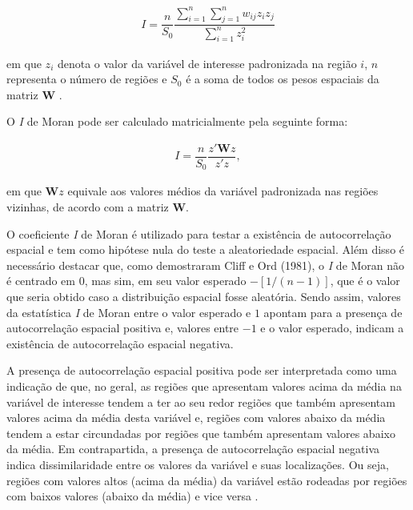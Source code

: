 \documentclass[12pt,a4paper]{article}
\begin{document}
\begin{align}\label{IMoran_g}
    I = \dfrac{n}{S_0} \dfrac{\displaystyle\sum_{i=1}^{n} \displaystyle\sum_{j=1}^{n} w_{ij} z_i z_j}{\displaystyle\sum_{i=1}^{n} z_i^2}
\end{align}
	
\noindent em que $z_i$ denota o valor da variável de interesse padronizada na região $i$, $n$ representa o número de regiões e $S_0$ é a soma de todos os pesos espaciais da matriz $\boldsymbol{W}$ \cite{almeida12_g}.
	
O \textit{I} de Moran pode ser calculado matricialmente pela seguinte forma:
	
\begin{align*}
	I = \dfrac{n}{S_0} \dfrac{z'\boldsymbol{W}z}{z'z},
\end{align*}
	
\noindent em que $\boldsymbol{W}z$ equivale aos valores médios da variável padronizada nas regiões vizinhas, de acordo com a matriz $\boldsymbol{W}$.

O coeficiente \textit{I} de Moran é utilizado para testar a existência de autocorrelação espacial e tem como hipótese nula do teste a aleatoriedade espacial. Além disso é necessário destacar que, como demostraram Cliff e Ord (1981), o \textit{I} de Moran não é centrado em $0$, mas sim, em seu valor esperado $-[1/(n-1)]$, que é o valor que seria obtido caso a distribuição espacial fosse aleatória. Sendo assim, valores da estatística \textit{I} de Moran entre o valor esperado e $1$ apontam para a presença de autocorrelação espacial positiva e, valores entre $-1$ e o valor esperado, indicam a existência de autocorrelação espacial negativa. 
	
A presença de autocorrelação espacial positiva pode ser interpretada como uma indicação de que, no geral, as regiões que apresentam valores acima da média na variável de interesse tendem a ter ao seu redor regiões que também apresentam valores acima da média desta variável e, regiões com valores abaixo da média tendem a estar circundadas por regiões que também apresentam valores abaixo da média. Em contrapartida, a presença de autocorrelação espacial negativa indica dissimilaridade entre os valores da variável e suas localizações. Ou seja, regiões com valores altos (acima da média) da variável estão rodeadas por regiões com baixos valores (abaixo da média) e vice versa \cite{almeida12_g}. 
	
\end{document}
